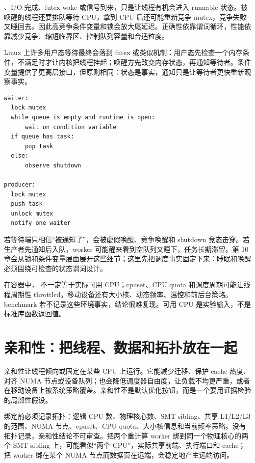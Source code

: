 、I/O 完成、futex wake 或信号到来，只是让线程有机会进入 runnable 状态。被唤醒的线程还要排队等待 CPU，拿到 CPU 后还可能重新竞争 mutex，竞争失败又睡回去。因此高竞争条件变量和锁会放大尾延迟。正确性依靠谓词循环，性能依靠减少竞争、缩短临界区、控制队列容量和合适粒度。

Linux 上许多用户态等待最终会落到 futex 或类似机制：用户态先检查一个内存条件，不满足时才让内核把线程挂起；唤醒方先改变内存状态，再通知等待者。条件变量提供了更高层接口，但原则相同：状态是事实，通知只是让等待者更快重新观察事实。

\begin{lstlisting}[numbers=none,caption={等待谓词的正确顺序}]
waiter:
  lock mutex
  while queue is empty and runtime is open:
      wait on condition variable
  if queue has task:
      pop task
  else:
      observe shutdown

producer:
  lock mutex
  push task
  unlock mutex
  notify one waiter
\end{lstlisting}

若等待端只相信“被通知了”，会被虚假唤醒、竞争唤醒和 shutdown 竞态击穿。若生产者先通知后入队，worker 可能醒来看到空队列又睡下，任务长期滞留。第 10 章会从锁和条件变量层面展开这些细节；这里先把调度事实固定下来：睡眠和唤醒必须围绕可检查的状态谓词设计。

在容器中， 不一定等于实际可用 CPU；cpuset、CPU quota 和调度周期可能让线程周期性 throttled。移动设备还有大小核、动态频率、温控和前后台策略。benchmark 若不记录这些环境事实，结论很难复现。可用 CPU 是实验输入，不是标准库函数返回值。

\section{亲和性：把线程、数据和拓扑放在一起}

亲和性让线程倾向或固定在某些 CPU 上运行。它能减少迁移、保护 cache 热度、对齐 NUMA 节点或设备队列；也会降低调度器自由度，让负载不均更严重，或者在移动设备上被系统策略覆盖。亲和性不是默认优化按钮，而是一个要用证据检验的局部性假设。

绑定前必须记录拓扑：逻辑 CPU 数、物理核心数、SMT sibling、共享 L1/L2/L3 的范围、NUMA 节点、cpuset、CPU quota、大小核信息和当前频率策略。没有拓扑记录，亲和性结论不可审查。把两个重计算 worker 绑到同一个物理核心的两个 SMT sibling 上，可能看似“两个 CPU”，实际共享前端、执行端口和 cache；把 worker 绑在某个 NUMA 节点而数据页在远端，会稳定地产生远端访问。

